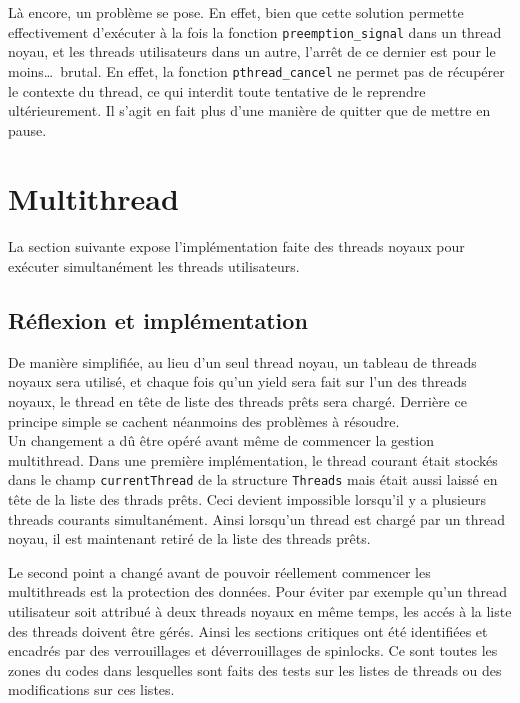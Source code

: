 \documentclass[a4paper,11pt]{article}
\begin{document}
Là encore, un problème se pose. En effet, bien que cette solution permette effectivement d'exécuter à la fois la fonction \texttt{preemption\_signal} dans un thread noyau, et les threads utilisateurs dans un autre, l'arrêt de ce dernier est pour le moins\dots\ brutal. En effet, la fonction \texttt{pthread\_cancel} ne permet pas de récupérer le contexte du thread, ce qui interdit toute tentative de le reprendre ultérieurement. Il s'agit en fait plus d'une manière de quitter que de mettre en pause.

\section{Multithread}

La section suivante expose l'implémentation faite des threads noyaux pour exécuter simultanément les threads utilisateurs.

\subsection{Réflexion et implémentation}

De manière simplifiée, au lieu d'un seul thread noyau, un tableau de threads noyaux sera utilisé, et chaque fois qu'un yield sera fait sur l'un des threads noyaux, le thread en tête de liste des threads prêts sera chargé. Derrière ce principe simple se cachent néanmoins des problèmes à résoudre.\\

Un changement a dû être opéré avant même de commencer la gestion multithread. Dans une première implémentation, le thread courant était stockés dans le champ \texttt{currentThread} de la structure \texttt{Threads} mais était aussi laissé en tête de la liste des thrads prêts. Ceci devient impossible lorsqu'il y a plusieurs threads courants simultanément. Ainsi lorsqu'un thread est chargé par un thread noyau, il est maintenant retiré de la liste des threads prêts.

Le second point a changé avant de pouvoir réellement commencer les multithreads est la protection des données. Pour éviter par exemple qu'un thread utilisateur soit attribué à deux threads noyaux en même temps, les accés à la liste des threads doivent être gérés. Ainsi les sections critiques ont été identifiées et encadrés par des verrouillages et déverrouillages de spinlocks. Ce sont toutes les zones du codes dans lesquelles sont faits des tests sur les listes de threads ou des modifications sur ces listes.\\
\end{document}
